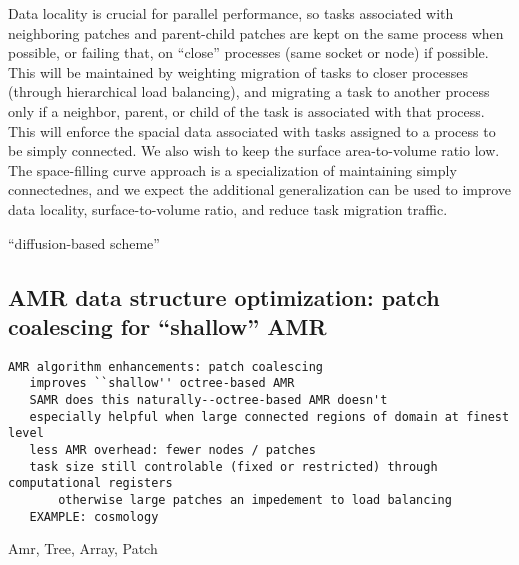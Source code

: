 \documentclass[14pt,letter]{article}
\begin{document}
%
Data locality is crucial for parallel performance, so tasks associated
with neighboring patches and parent-child patches are kept on the same
process when possible, or failing that, on ``close'' processes (same
socket or node) if possible.  This will be maintained by weighting
migration of tasks to closer processes (through hierarchical load
balancing), and migrating a task to another process only if a
neighbor, parent, or child of the task is associated with that
process.  This will enforce the spacial data associated with tasks
assigned to a process to be simply connected.  We also wish to keep
the surface area-to-volume ratio low.  The space-filling curve
approach is a specialization of maintaining simply connectednes, and
we expect the additional generalization can be used to improve data
locality, surface-to-volume ratio, and reduce task migration traffic.

``diffusion-based scheme''

\subsection{AMR data structure optimization: patch coalescing  for ``shallow'' AMR}

\begin{verbatim}
AMR algorithm enhancements: patch coalescing
   improves ``shallow'' octree-based AMR
   SAMR does this naturally--octree-based AMR doesn't
   especially helpful when large connected regions of domain at finest level
   less AMR overhead: fewer nodes / patches
   task size still controlable (fixed or restricted) through computational registers
       otherwise large patches an impedement to load balancing
   EXAMPLE: cosmology
\end{verbatim}

Amr, Tree, Array, Patch

\end{document}
